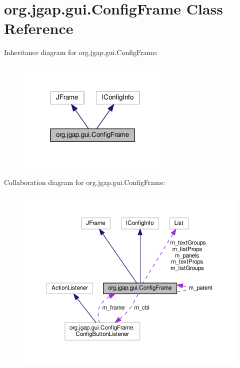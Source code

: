 \hypertarget{classorg_1_1jgap_1_1gui_1_1_config_frame}{\section{org.\-jgap.\-gui.\-Config\-Frame Class Reference}
\label{classorg_1_1jgap_1_1gui_1_1_config_frame}
}


Inheritance diagram for org.\-jgap.\-gui.\-Config\-Frame\-:
\nopagebreak
\begin{figure}[H]
\begin{center}
\leavevmode
\includegraphics[width=213pt]{classorg_1_1jgap_1_1gui_1_1_config_frame__inherit__graph}
\end{center}
\end{figure}


Collaboration diagram for org.\-jgap.\-gui.\-Config\-Frame\-:
\nopagebreak
\begin{figure}[H]
\begin{center}
\leavevmode
\includegraphics[width=350pt]{classorg_1_1jgap_1_1gui_1_1_config_frame__coll__graph}
\end{center}
\end{figure}
